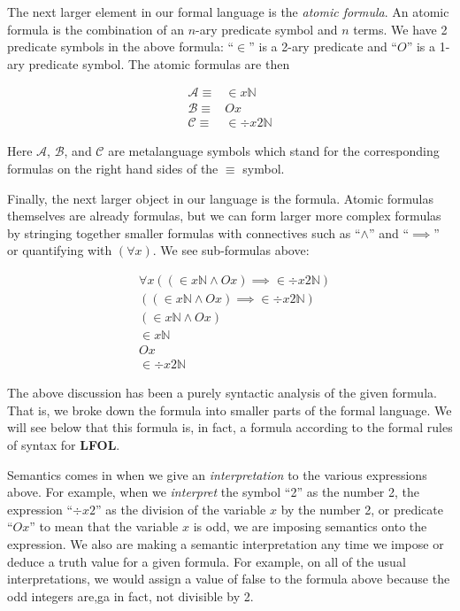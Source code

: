 \documentclass[12pt]{article}
\theoremstyle{break}
\theoremstyle{break}
\theoremstyle{break}
\theoremstyle{break}
\theoremstyle{break}
\newtheorem{informal definition}[definition]{Informal Definition}
\newcommand{\mc}[1]{\mathcal{#1}}
\newcommand{\qq}[1]{``#1''}
\begin{document}
The next larger element in our formal language is the \textit{atomic formula}.
An atomic formula is the combination of an $n$-ary predicate symbol and $n$ terms.
We have 2 predicate symbols in the above formula: \qq{$\in$} is a 2-ary predicate and \qq{$O$} is a 1-ary predicate symbol.
The atomic formulas are then

\begin{align*}
\mc{A} \equiv& \in x \mathbb{N}\\
\mc{B} \equiv& Ox\\
\mc{C} \equiv& \in \div x2 \mathbb{N}
\end{align*}

Here $\mc{A}$, $\mc{B}$, and $\mc{C}$ are metalanguage symbols which stand for the corresponding formulas on the right hand sides of the $\equiv$ symbol.

Finally, the next larger object in our language is the formula.
Atomic formulas themselves are already formulas, but we can form larger more complex formulas by stringing together smaller formulas with connectives such as \qq{$\land$} and \qq{$\implies$} or quantifying with $(\forall x)$.
We see sub-formulas above:

\begin{align*}
& \forall x((\in x \mathbb{N} \land Ox)\implies \in \div x 2 \mathbb{N}) \\
& ((\in x \mathbb{N} \land Ox)\implies \in \div x 2 \mathbb{N}) \\
& (\in x \mathbb{N} \land Ox)\\
& \in x \mathbb{N}\\
& Ox \\
&  \in \div x 2 \mathbb{N}
\end{align*}

The above discussion has been a purely syntactic analysis of the given formula.
That is, we broke down the formula into smaller parts of the formal language.
We will see below that this formula is, in fact, a formula according to the formal rules of syntax for \textbf{LFOL}.

Semantics comes in when we give an \textit{interpretation} to the various expressions above.
For example, when we \textit{interpret} the symbol \qq{2} as the number 2, the expression \qq{$\div x 2$} as the division of the variable $x$ by the number 2, or predicate \qq{$Ox$} to mean that the variable $x$ is odd, we are imposing semantics onto the expression.
We also are making a semantic interpretation any time we impose or deduce a truth value for a given formula.
For example, on all of the usual interpretations, we would assign a value of false to the formula above because the odd integers are,ga in fact, not divisible by 2.
\end{document}
